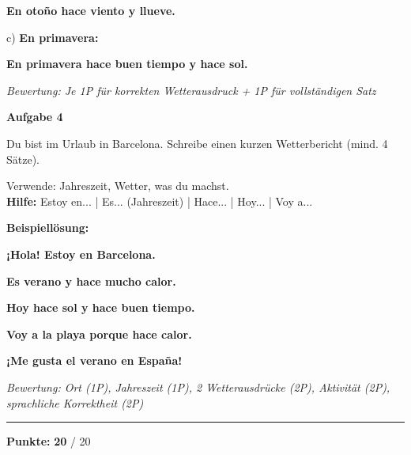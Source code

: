 \documentclass[11pt, a4paper]{article}
\newcommand{\fachfarbe}{spanisch}
\newcommand{\maxpunkte}{20}
\newcommand{\punktebox}[1]{\hfill\fbox{\small \_/#1}}
\newcommand{\loesung}[1]{\textcolor{loesung}{\textbf{#1}}}
\newenvironment{aufgabe}[1]{%
    \needspace{5\baselineskip}%
    \nopagebreak[4]%
    \vspace{10pt}
    \noindent\textbf{\textcolor{\fachfarbe}{Aufgabe #1}}
    \nopagebreak[4]%
    \vspace{5pt}
    \nopagebreak[4]%
    \begin{list}{}{\leftmargin=0pt}
    \item[]
}{%
    \end{list}
}
\begin{document}
\loesung{En otoño hace viento y llueve.}

\vspace{0.8em}

c) \textbf{En primavera:}

\loesung{En primavera hace buen tiempo y hace sol.}

\textit{\textcolor{grau}{Bewertung: Je 1P für korrekten Wetterausdruck + 1P für vollständigen Satz}}

\vspace{15pt}


\begin{aufgabe}{4}
Du bist im Urlaub in Barcelona. Schreibe einen kurzen Wetterbericht (mind. 4 Sätze). \punktebox{8}
\end{aufgabe}

\begin{hinweis}
Verwende: Jahreszeit, Wetter, was du machst. \\
\textbf{Hilfe:} Estoy en... | Es... (Jahreszeit) | Hace... | Hoy... | Voy a...
\end{hinweis}

\vspace{0.5em}

\textbf{Beispiellösung:}

\loesung{¡Hola! Estoy en Barcelona.}

\loesung{Es verano y hace mucho calor.}

\loesung{Hoy hace sol y hace buen tiempo.}

\loesung{Voy a la playa porque hace calor.}

\loesung{¡Me gusta el verano en España!}

\vspace{0.5em}
\textit{\textcolor{grau}{Bewertung: Ort (1P), Jahreszeit (1P), 2 Wetterausdrücke (2P), Aktivität (2P), sprachliche Korrektheit (2P)}}


\vspace{20pt}
\hrule
\vspace{10pt}

\begin{flushright}
\textbf{Punkte:} \loesung{\maxpunkte} / \maxpunkte
\end{flushright}
\end{document}
